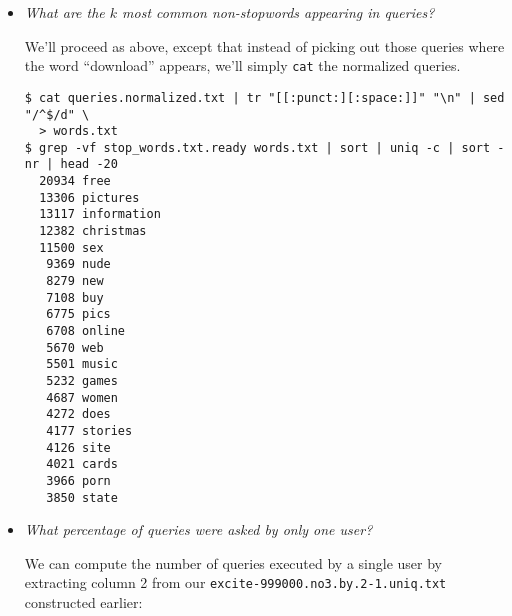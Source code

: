 \begin{itemize}
We pick out those queries from our normalized list of queries that contain the
word download, and split those queries into words. We proceed by turning every
punctuation symbol or space into a line break, and removing those lines which
now become empty:

\begin{lstlisting}
$ grep "download" queries.normalized.txt | tr "[[:punct:][:space:]]" "\n" | \
  sed "/^$/d" > words.txt
\end{lstlisting}

We can now proceed to pick out those words that do not occur in our
preprocessed stopwords file. We then sort those words, pick count their unique
occurrences, sort by the counts, and take the top 20:

\begin{lstlisting}
$ grep -vf stop_words.txt.ready words.txt | sort | uniq -c | sort -nr | head -20
   3441 download
   1110 downloads
    837 free
    394 games
    282 mp3
    256 game
    237 music
    133 downloadable
    109 software
    108 pokemon
     92 windows
     78 christmas
     70 mac
     68 player
     67 pc
     66 internet
     65 demo
     64 funny
     60 files
     55 cd
\end{lstlisting}

As might be expected, people are looking for free downloads of games, music
(mp3), and software. 

\item \emph{What are the $k$ most common non-stopwords appearing in queries?}

We'll proceed as above, except that instead of picking out those queries where
the word ``download'' appears, we'll simply \texttt{cat} the normalized
queries.

\begin{lstlisting}
$ cat queries.normalized.txt | tr "[[:punct:][:space:]]" "\n" | sed "/^$/d" \
  > words.txt
$ grep -vf stop_words.txt.ready words.txt | sort | uniq -c | sort -nr | head -20
  20934 free
  13306 pictures
  13117 information
  12382 christmas
  11500 sex
   9369 nude
   8279 new
   7108 buy
   6775 pics
   6708 online
   5670 web
   5501 music
   5232 games
   4687 women
   4272 does
   4177 stories
   4126 site
   4021 cards
   3966 porn
   3850 state
\end{lstlisting}

\item \emph{What percentage of queries were asked by only one user?}

We can compute the number of queries executed by a single user by extracting
column 2 from our \texttt{excite-999000.no3.by.2-1.uniq.txt} constructed
earlier:


\end{itemize}
